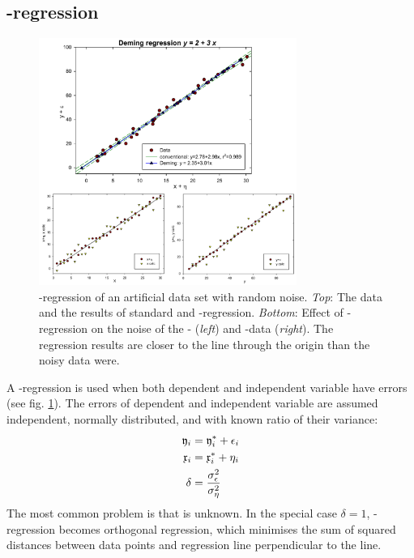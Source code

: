 \begin{refsection}
\section{-regression}\label{sec:Deming}

\begin{figure}
 \caption{-regression of an artificial data set with random noise. \emph{Top}: The data and the results of standard and -regression. \emph{Bottom}: Effect of -regression on the noise of the - (\emph{left}) and -data (\emph{right}). The regression results are closer to the line through the origin than the noisy data were. }
 \label{fig:Deming}
 \centering
 \includegraphics[width=0.75\textwidth]{Graphics/Deming}
\end{figure}

A -regression \parencite{Adc-78,Kum-79,Dem-43} is used when both dependent and independent variable have errors (see fig. \ref{fig:Deming}). The errors of dependent and independent variable are assumed independent, normally distributed, and with known ratio of their variance:
\begin{align}
  \mathfrak{y}_i &= \mathfrak{y}_i^* + \epsilon_i \\
  \mathfrak{x}_i &= \mathfrak{x}_i^* + \eta_i \\
  \delta &= \frac{\sigma_\epsilon^2}{\sigma_\eta^2}
\end{align}
The most common problem is that \skalar{\delta} is unknown. In the special case \(\delta = 1 \), -regression becomes orthogonal regression, which minimises the sum of squared distances between data points and regression line perpendicular to the line.


\end{refsection}
